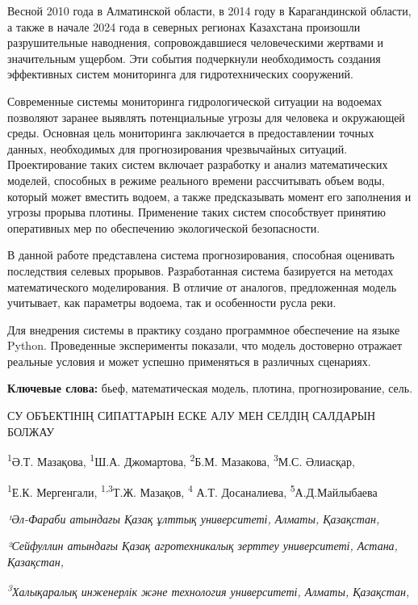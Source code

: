 \documentclass[
]{article}
\begin{document}
Весной 2010 года в Алматинской области, в 2014 году в Карагандинской
области, а также в начале 2024 года в северных регионах Казахстана
произошли разрушительные наводнения, сопровождавшиеся человеческими
жертвами и значительным ущербом. Эти события подчеркнули необходимость
создания эффективных систем мониторинга для гидротехнических сооружений.

Современные системы мониторинга гидрологической ситуации на водоемах
позволяют заранее выявлять потенциальные угрозы для человека и
окружающей среды. Основная цель мониторинга заключается в предоставлении
точных данных, необходимых для прогнозирования чрезвычайных ситуаций.
Проектирование таких систем включает разработку и анализ математических
моделей, способных в режиме реального времени рассчитывать объем воды,
который может вместить водоем, а также предсказывать момент его
заполнения и угрозы прорыва плотины. Применение таких систем
способствует принятию оперативных мер по обеспечению экологической
безопасности.

В данной работе представлена система прогнозирования, способная
оценивать последствия селевых прорывов. Разработанная система базируется
на методах математического моделирования. В отличие от аналогов,
предложенная модель учитывает, как параметры водоема, так и особенности
русла реки.

Для внедрения системы в практику создано программное обеспечение на
языке Python. Проведенные эксперименты показали, что модель достоверно
отражает реальные условия и может успешно применяться в различных
сценариях.

\textbf{Ключевые слова:} бьеф, математическая модель, плотина,
прогнозирование, сель.

СУ ОБЪЕКТІНІҢ СИПАТТАРЫН ЕСКЕ АЛУ МЕН СЕЛДІҢ САЛДАРЫН БОЛЖАУ

\textsuperscript{1}Ә.Т. Мазақова, \textsuperscript{1}Ш.А. Джомартова,
\textsuperscript{2}Б.М. Мазакова, \textsuperscript{3}М.С. Әлиасқар,

\textsuperscript{1}Е.К. Мергенгали, \textsuperscript{1,3}Т.Ж. Мазақов,
\textsuperscript{4} А.Т. Досаналиева, \textsuperscript{5}А.Д.Майлыбаева

\emph{¹Әл-Фараби атындағы Қазақ ұлттық университеті, Алматы, Қазақстан,}

\emph{²Сейфуллин атындағы Қазақ агротехникалық зерттеу университеті,
Астана, Қазақстан,}

\emph{\textsuperscript{3}Халықаралық инженерлік және технология
университеті, Алматы, Қазақстан,}
\end{document}
